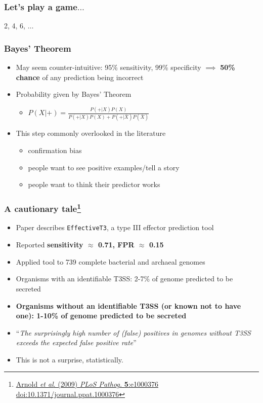 \begin{frame}
  \frametitle{Let's play a game$\ldots$}
  2, 4, 6, $\ldots$
\end{frame}

\begin{frame}
  \frametitle{Bayes' Theorem}
  \begin{itemize}
    \item May seem counter-intuitive: 95\% sensitivity, 99\% specificity $\implies$ \textbf{50\% chance} of any prediction being incorrect
    \item Probability given by Bayes' Theorem
    \begin{itemize}
      \item $P(X|+) =  \frac{P(+|X) P(X)}{P(+|X) P(X) + P(+|\bar{X}) P(\bar{X})}$
    \end{itemize}
    \item This step commonly overlooked in the literature
      \begin{itemize}
        \item confirmation bias
        \item people want to see positive examples/tell a story
        \item people want to think their predictor works
      \end{itemize}
  \end{itemize} 
\end{frame}

\begin{frame}
  \frametitle{A cautionary tale\footnote{\tiny{\href{http://dx.doi.org/10.1371/journal.ppat.1000376}{Arnold \textit{et al}. (2009) \textit{PLoS Pathog.} \textbf{5}:e1000376 doi:10.1371/journal.ppat.1000376}}}}
  \begin{itemize}
    \item<1-> Paper describes \texttt{EffectiveT3}, a type III effector prediction tool
    \item<1-> Reported \textbf{sensitivity $\approx$ 0.71, FPR $\approx$ 0.15}
    \item<1-> Applied tool to 739 complete bacterial and archaeal genomes
    \item<2-> Organisms with an identifiable T3SS: 2-7\% of genome predicted to be secreted
    \item<2-> \textbf{Organisms without an identifiable T3SS (or known not to have one): 1-10\% of genome predicted to be secreted}
    \item<2-> ``\textit{The surprisingly high number of (false) positives in genomes without T3SS exceeds the expected false positive rate}''
    \item<2-> This is not a surprise, statistically.
  \end{itemize} 
\end{frame}

